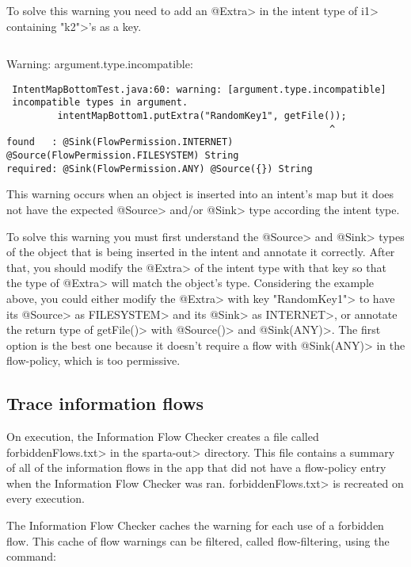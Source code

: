 To solve this warning you need to add an \<@Extra> in the intent type of
\<i1> containing \<"k2">'s as a key.

\begin{Verbatim}

\end{Verbatim}

\noindent
Warning: argument.type.incompatible:

\begin{Verbatim}
 IntentMapBottomTest.java:60: warning: [argument.type.incompatible] 
 incompatible types in argument.
         intentMapBottom1.putExtra("RandomKey1", getFile());
                                                         ^
found   : @Sink(FlowPermission.INTERNET) @Source(FlowPermission.FILESYSTEM) String
required: @Sink(FlowPermission.ANY) @Source({}) String
\end{Verbatim}

This warning occurs when an object is inserted into an intent's map but it
does not have the expected \<@Source> and/or \<@Sink> type according the
intent type.

To solve this warning you must first understand the \<@Source> and \<@Sink>
types of the object that is being inserted in the intent and annotate it
correctly. After that, you should modify the \<@Extra> of the
intent type with that key so that the type of \<@Extra> will match the object's
type. Considering the example above, you could either modify the \<@Extra> with
key \<"RandomKey1"> to have its \<@Source> as \<FILESYSTEM> and its \<@Sink> as
\<INTERNET>, or annotate the return type of
\<getFile()> with \<@Source({})> and \<@Sink(ANY)>. The first option is the best one
because it doesn't require a flow with \<@Sink(ANY)> in the flow-policy, which
is too permissive.


\subsection{Trace information flows\label{sec:trace-types}}

On execution, the Information Flow Checker creates a file called \<forbiddenFlows.txt> in the 
\<sparta-out>  directory. This file contains a summary of all of the information flows
in the app that did not have a flow-policy entry when the Information Flow Checker was ran.
\<forbiddenFlows.txt> is recreated on every execution.

The Information Flow Checker caches the warning for each use of a forbidden flow.
This cache of flow warnings can be filtered, called flow-filtering, using the command:

